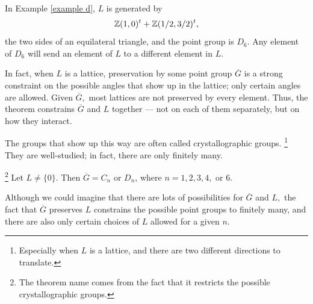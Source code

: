 In Example \ref{example d}, $L$ is generated by 
\[
\mathbb Z(1, 0)^t + \mathbb Z(1/2, 3/2)^t,
\]
the two sides of an equilateral triangle, and the point group is $D_6.$ Any element of $D_6$ will send an element of $L$ to a different element in $L.$

In fact, when $L$ is a lattice, preservation by some point group $\overline{G}$ is a strong constraint on the possible angles that show up in the lattice; only certain angles are allowed. Given $\overline{G},$ most lattices are not preserved by every element. Thus, the theorem constrains $\overline{G}$ and $L$ together --- not on each of them separately, but on how they interact. 

The groups that show up this way are often called crystallographic groups. \footnote{Especially when $L$ is a lattice, and there are two different directions to translate.} They are well-studied; in fact, there are only finitely many.


\begin{theorem}\footnote{The theorem name comes from the fact that it restricts the possible crystallographic groups.}
Let $L \neq \{0\}.$ Then $\overline{G} = C_n$ or $D_n$, where $n = 1, 2, 3, 4,$ or $6.$
\end{theorem}


Although we could imagine that there are lots of possibilities for $\overline{G}$ and $L,$ the fact that $\overline{G}$ preserves $L$ constrains the possible point groups to finitely many, and there are also only certain choices of $L$ allowed for a given $n.$


